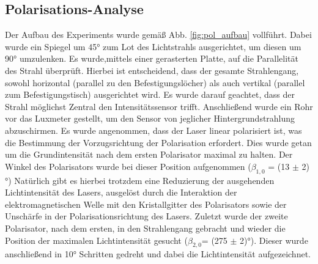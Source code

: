 \subsection{Polarisations-Analyse}

Der Aufbau des Experiments wurde gemäß Abb. \ref{fig:pol_aufbau} vollführt. 
Dabei wurde ein Spiegel um 45° zum Lot des Lichtstrahls ausgerichtet, um diesen um 90° umzulenken.
Es wurde,mittels einer gerasterten Platte, auf die Parallelität des Strahl überprüft.
Hierbei ist entscheidend, dass der gesamte Strahlengang, sowohl horizontal (parallel zu den Befestigungslöcher) als auch vertikal (parallel zum Befestigungstisch) ausgerichtet wird.
Es wurde darauf geachtet, dass der Strahl möglichst Zentral den Intensitätssensor trifft.
Anschließend wurde ein Rohr vor das Luxmeter gestellt, um den Sensor von jeglicher Hintergrundstrahlung abzuschirmen.
Es wurde angenommen, dass der Laser linear polarisiert ist, was die Bestimmung der Vorzugsrichtung der Polarisation erfordert.
Dies wurde getan um die Grundintensität nach dem ersten Polarisator maximal zu halten.
Der Winkel des Polarisators wurde bei dieser Position aufgenommen ($\beta_{1,0}$ = (13 $\pm$ 2)°)
Natürlich gibt es hierbei trotzdem eine Reduzierung der ausgehenden Lichtintensität des Lasers, ausgelöst durch die Interaktion der elektromagnetischen Welle mit den Kristallgitter des Polarisators sowie der Unschärfe in der Polarisationsrichtung des Lasers.
Zuletzt wurde der zweite Polarisator, nach dem ersten, in den Strahlengang gebracht und wieder die Position der maximalen Lichtintensität gesucht ($\beta_{2,0}$= (275 $\pm$ 2)°).
Dieser wurde anschließend in 10° Schritten gedreht und dabei die Lichtintensität aufgezeichnet.


